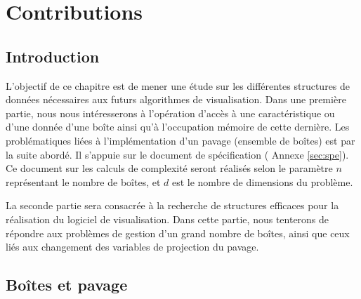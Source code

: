\chapter{Contributions}\label{chap:con}


\section{Introduction}%

L'objectif de ce chapitre est de mener une étude sur les différentes structures de données nécessaires aux futurs algorithmes de visualisation. Dans une première partie, nous nous intéresserons à l'opération d'accès à une caractéristique ou d'une donnée d'une boîte ainsi qu'à l'occupation mémoire de cette dernière. Les problématiques liées à l'implémentation d'un pavage (ensemble de boîtes) est par la suite abordé. Il s'appuie sur le document de spécification (\cf{}  Annexe \ref{sec:spe}). Ce document sur les calculs de complexité seront réalisés selon le paramètre $n$  représentant le nombre de boîtes, et $d$ est le nombre de dimensions du problème.


La seconde partie sera consacrée à la recherche de structures efficaces pour la réalisation du logiciel de visualisation. Dans cette partie, nous tenterons de répondre aux problèmes de gestion d'un grand nombre de boîtes, ainsi que ceux liés aux changement des variables de projection du pavage.




\section{Boîtes et pavage}

